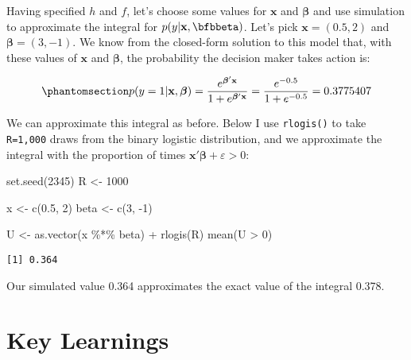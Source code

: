 \documentclass[
  letterpaper,
  DIV=11,
  numbers=noendperiod]{scrreprt}
\newenvironment{Shaded}{\begin{snugshade}}{\end{snugshade}}
\newcommand{\DecValTok}[1]{\textcolor[rgb]{0.68,0.00,0.00}{#1}}
\newcommand{\FloatTok}[1]{\textcolor[rgb]{0.68,0.00,0.00}{#1}}
\newcommand{\FunctionTok}[1]{\textcolor[rgb]{0.28,0.35,0.67}{#1}}
\newcommand{\NormalTok}[1]{\textcolor[rgb]{0.00,0.23,0.31}{#1}}
\newcommand{\OtherTok}[1]{\textcolor[rgb]{0.00,0.23,0.31}{#1}}
\newcommand{\SpecialCharTok}[1]{\textcolor[rgb]{0.37,0.37,0.37}{#1}}
\begin{document}
Having specified \(h\) and \(f\), let's choose some values for
\(\mathbf{x}\) and \(\boldsymbol{\beta}\) and use simulation to
approximate the integral for \(p(y|\mathbf{x},\bfbbeta)\). Let's pick
\(\mathbf{x}=(0.5, 2)\) and \(\boldsymbol{\beta}=(3,-1)\). We know from
the closed-form solution to this model that, with these values of
\(\mathbf{x}\) and \(\boldsymbol{\beta}\), the probability the decision
maker takes action is:

\begin{equation}\phantomsection\label{eq-binlogit_example}{
p(y=1 | \mathbf{x}, \boldsymbol{\beta}) = \frac{e^{\boldsymbol{\beta}'\mathbf{x}}}{1 + e^{\boldsymbol{\beta}'\mathbf{x}}} = \frac{e^{-0.5}}{1+e^{-0.5}} = 0.3775407
}\end{equation}

We can approximate this integral as before. Below I use
\texttt{rlogis()} to take \texttt{R=1,000} draws from the binary
logistic distribution, and we approximate the integral with the
proportion of times \(\mathbf{x}'\boldsymbol{\beta}+ \varepsilon > 0\):

\begin{Shaded}
\begin{Highlighting}[]
\FunctionTok{set.seed}\NormalTok{(}\DecValTok{2345}\NormalTok{)}
\NormalTok{R }\OtherTok{\textless{}{-}} \DecValTok{1000}

\NormalTok{x    }\OtherTok{\textless{}{-}} \FunctionTok{c}\NormalTok{(}\FloatTok{0.5}\NormalTok{, }\DecValTok{2}\NormalTok{)}
\NormalTok{beta }\OtherTok{\textless{}{-}} \FunctionTok{c}\NormalTok{(}\DecValTok{3}\NormalTok{, }\SpecialCharTok{{-}}\DecValTok{1}\NormalTok{)}

\NormalTok{U }\OtherTok{\textless{}{-}} \FunctionTok{as.vector}\NormalTok{(x }\SpecialCharTok{\%*\%}\NormalTok{ beta) }\SpecialCharTok{+} \FunctionTok{rlogis}\NormalTok{(R)}
\FunctionTok{mean}\NormalTok{(U }\SpecialCharTok{\textgreater{}} \DecValTok{0}\NormalTok{)}
\end{Highlighting}
\end{Shaded}

\begin{verbatim}
[1] 0.364
\end{verbatim}

Our simulated value 0.364 approximates the exact value of the integral
0.378.

\section{Key Learnings}\label{key-learnings}
\end{document}
